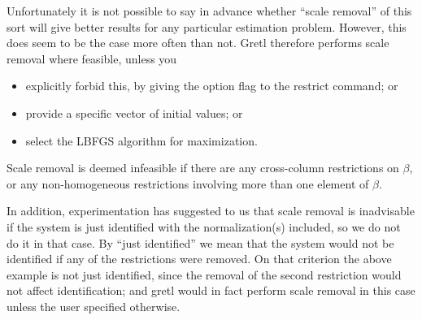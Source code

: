Unfortunately it is not possible to say in advance whether ``scale
removal'' of this sort will give better results for any particular
estimation problem.  However, this does seem to be the case more often
than not.  Gretl therefore performs scale removal where feasible,
unless you
\begin{itemize}
\item explicitly forbid this, by giving the  option
  flag to the restrict command; or
\item provide a specific vector of initial values; or
\item select the LBFGS algorithm for maximization.
\end{itemize}

Scale removal is deemed infeasible if there are any cross-column
restrictions on $\beta$, or any non-homogeneous restrictions involving
more than one element of $\beta$.  

In addition, experimentation has suggested to us that scale removal is
inadvisable if the system is just identified with the normalization(s)
included, so we do not do it in that case.  By ``just identified'' we
mean that the system would not be identified if any of the
restrictions were removed.  On that criterion the above example is not
just identified, since the removal of the second restriction would not
affect identification; and gretl would in fact perform scale
removal in this case unless the user specified otherwise.

